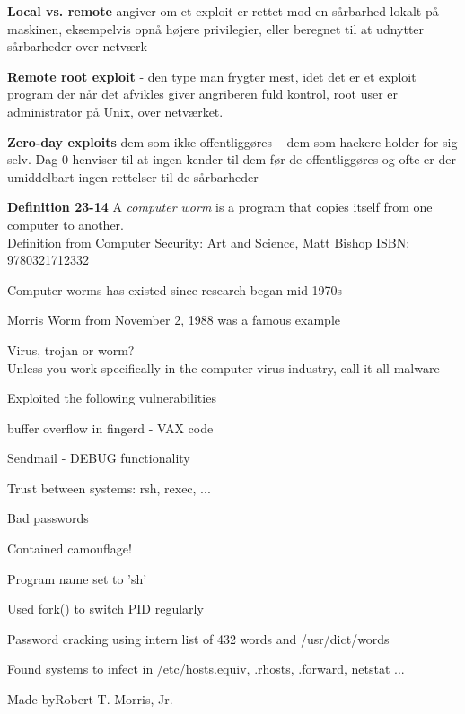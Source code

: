 \documentclass[Screen16to9,17pt]{foils}
\begin{document}
\begin{list1}
\item {\bfseries Local vs. remote}
angiver om et exploit er rettet mod
en sårbarhed lokalt på maskinen, eksempelvis
opnå højere privilegier, eller beregnet
til at udnytter sårbarheder over netværk
\item {\bfseries Remote root exploit}
- den type man frygter mest, idet
det er et exploit program der når det afvikles giver
angriberen fuld kontrol, root user er administrator
på Unix, over netværket.
\item {\bfseries Zero-day exploits} dem som ikke offentliggøres -- dem
  som hackere holder for sig selv. Dag 0 henviser til at ingen kender
  til dem før de offentliggøres og ofte er der umiddelbart ingen
  rettelser til de sårbarheder
\end{list1}


\begin{list1}
\item {\bf Definition 23-14} A \emph{computer worm} is a program that copies itself from one computer to another.\\
Definition from Computer Security: Art and Science, Matt Bishop ISBN: 9780321712332
\item Computer worms has existed since research began mid-1970s
\item Morris Worm from November 2, 1988 was a famous example
\vskip 2cm
\item Virus, trojan or worm?\\
Unless you work specifically in the computer virus industry, call it all malware

\end{list1}



\begin{list1}
\item Exploited the following vulnerabilities
\begin{list2}
\item buffer overflow in fingerd - VAX code
\item Sendmail - DEBUG functionality
\item Trust between systems: rsh, rexec, ...
\item Bad passwords
\end{list2}
\item Contained camouflage!
\begin{list2}
\item Program name set to 'sh'
\item Used fork() to switch PID regularly
\item Password cracking using intern list of 432 words and /usr/dict/words
\item Found systems to infect in /etc/hosts.equiv, .rhosts, .forward, netstat ...
\end{list2}
\item Made byRobert T. Morris, Jr.
\end{list1}
\end{document}
